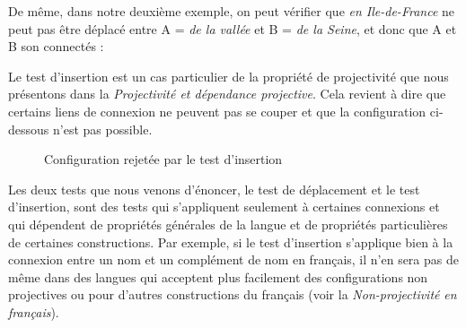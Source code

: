De même, dans notre deuxième exemple, on peut vérifier que \textit{en Ile-de-France} ne peut pas être déplacé entre A = \textit{de la vallée} et B = \textit{de la Seine}, et donc que A et B son connectés :

\z
Le test d’insertion est un cas particulier de la propriété de projectivité que nous présentons dans la  \textit{Projectivité et dépendance projective}. Cela revient à dire que certains liens de connexion ne peuvent pas se couper et que la configuration ci-dessous n’est pas possible.

\begin{figure}
\caption{Configuration rejetée par le test d’insertion}
\end{figure}

Les deux tests que nous venons d’énoncer, le test de déplacement et le test d’insertion, sont des tests qui s’appliquent seulement à certaines connexions et qui dépendent de propriétés générales de la langue et de propriétés particulières de certaines constructions. Par exemple, si le test d’insertion s’applique bien à la connexion entre un nom et un complément de nom en français, il n’en sera pas de même dans des langues qui acceptent plus facilement des configurations non projectives ou pour d’autres constructions du français (voir la  \textit{Non-projectivité} \textit{en français}).

